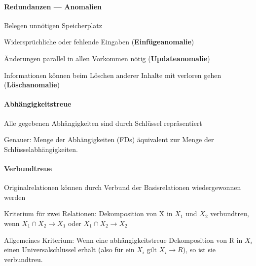 \paragraph{Redundanzen --- Anomalien}
\begin{items}
	\item Belegen unnötigen Speicherplatz
	\item Widersprüchliche oder fehlende Eingaben (\textbf{Einfügeanomalie})
	\item Änderungen parallel in allen Vorkommen nötig (\textbf{Updateanomalie})
	\item Informationen können beim Löschen anderer Inhalte mit verloren gehen (\textbf{Löschanomalie})
\end{items}

\paragraph{Abhängigkeitstreue}
\begin{items}
	\item Alle gegebenen Abhängigkeiten sind durch Schlüssel repräsentiert
	\item Genauer: Menge der Abhängigkeiten (FDs) äquivalent zur Menge der Schlüsselabhängigkeiten.
\end{items}

\paragraph{Verbundtreue}
\begin{items}
	\item Originalrelationen können durch Verbund der Basisrelationen wiedergewonnen werden
	\item Kriterium für zwei Relationen:
	Dekomposition von X in $X_1$ und $X_2$ verbundtreu, wenn $X_1 \cap X_2 \to X_1$ oder $X_1 \cap X_2 \to X_2$
	\item Allgemeines Kriterium: 
	Wenn eine abhängigkeitstreue Dekomposition von R in $X_i$ einen Universalschlüssel erhält (also für ein $X_i$ gilt $X_i \to R$), so ist sie verbundtreu.
\end{items}

